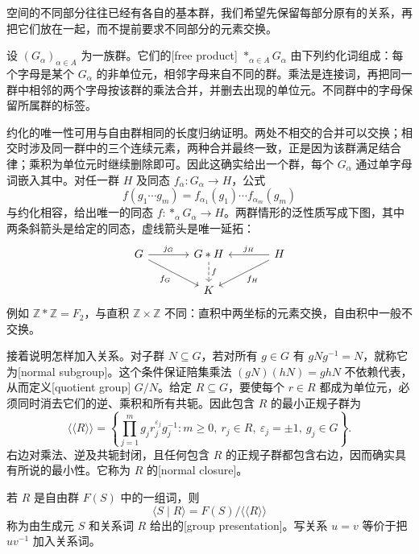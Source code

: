 空间的不同部分往往已经有各自的基本群，我们希望先保留每部分原有的关系，再把它们放在一起，而不提前要求不同部分的元素交换。

\begin{definition}\label{g1:def:free-product}
	设 \((G_\alpha)_{\alpha\in A}\) 为一族群。它们的[free product] \(\mathop{*}_{\alpha\in A}G_\alpha\) 由下列约化词组成：每个字母是某个 \(G_\alpha\) 的非单位元，相邻字母来自不同的群。乘法是连接词，再把同一群中相邻的两个字母按该群的乘法合并，并删去出现的单位元。不同群中的字母保留所属群的标签。
\end{definition}

约化的唯一性可用与自由群相同的长度归纳证明。两处不相交的合并可以交换；相交时涉及同一群中的三个连续元素，两种合并最终一致，正是因为该群满足结合律；乘积为单位元时继续删除即可。因此这确实给出一个群，每个 \(G_\alpha\) 通过单字母词嵌入其中。对任一群 \(H\) 及同态 \(f_\alpha:G_\alpha\to H\)，公式
\[
	f(g_1\cdots g_m)=f_{\alpha_1}(g_1)\cdots f_{\alpha_m}(g_m)
\]
与约化相容，给出唯一的同态 \(f:\mathop{*}_\alpha G_\alpha\to H\)。两群情形的泛性质写成下图，其中两条斜箭头是给定的同态，虚线箭头是唯一延拓：
\[
	\begin{tikzcd}[column sep=large]
		G \arrow[r,"j_G"] \arrow[dr,"f_G"'] & G*H \arrow[d,dashed,"f"] & H \arrow[l,"j_H"'] \arrow[dl,"f_H"]\\
		& K &
	\end{tikzcd}
\]
例如 \(\mathbb Z*\mathbb Z=F_2\)，与直积 \(\mathbb Z\times\mathbb Z\) 不同：直积中两坐标的元素交换，自由积中一般不交换。

接着说明怎样加入关系。对子群 \(N\subseteq G\)，若对所有 \(g\in G\) 有 \(gNg^{-1}=N\)，就称它为[normal subgroup]。这个条件保证陪集乘法 \((gN)(hN)=ghN\) 不依赖代表，从而定义[quotient group] \(G/N\)。给定 \(R\subseteq G\)，要使每个 \(r\in R\) 都成为单位元，必须同时消去它们的逆、乘积和所有共轭。因此包含 \(R\) 的最小正规子群为
\[
	\langle\!\langle R\rangle\!\rangle
	=\left\{\prod_{j=1}^{m}g_jr_j^{\varepsilon_j}g_j^{-1}:
	m\ge0,\ r_j\in R,\ \varepsilon_j=\pm1,\ g_j\in G\right\}.
\]
右边对乘法、逆及共轭封闭，且任何包含 \(R\) 的正规子群都包含右边，因而确实具有所说的最小性。它称为 \(R\) 的[normal closure]。

\begin{definition}\label{g1:def:group-presentation}
	若 \(R\) 是自由群 \(F(S)\) 中的一组词，则
	\[
		\langle S\mid R\rangle=F(S)/\langle\!\langle R\rangle\!\rangle
	\]
	称为由生成元 \(S\) 和关系词 \(R\) 给出的[group presentation]。写关系 \(u=v\) 等价于把 \(uv^{-1}\) 加入关系词。
\end{definition}

